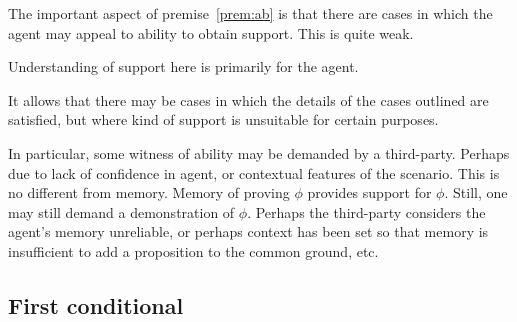 \begin{note}
  The important aspect of premise~\ref{prem:ab} is that there are cases in which the agent may appeal to ability to obtain support.
  This is quite weak.

  Understanding of support here is primarily for the agent.

  It allows that there may be cases in which the details of the cases outlined are satisfied, but where kind of support is unsuitable for certain purposes.

  In particular, some witness of ability may be demanded by a third-party.
  Perhaps due to lack of confidence in agent, or contextual features of the scenario.
  This is no different from memory.
  Memory of proving \(\phi\) provides support for \(\phi\).
  Still, one may still demand a demonstration of \(\phi\).
  Perhaps the third-party considers the agent's memory unreliable, or perhaps context has been set so that memory is insufficient to add a proposition to the common ground, etc.
\end{note}

\subsection{First conditional}
\label{sec:first-conditional}

